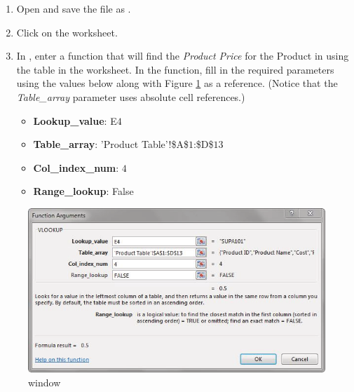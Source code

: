 \begin{enumerate}
	\item Open  and save the file as .
	\item Click on the  worksheet.
	\item In , enter a  function that will find the \textit{Product Price} for the Product in  using the table in the  worksheet. In the  function, fill in the required parameters using the values below along with Figure \ref{05:fig32} as a reference. (Notice that the \textit{Table\_array} parameter uses absolute cell references.)
	
	\begin{itemize}
		\item \textbf{Lookup\_value}: E$ 4 $
		\item \textbf{Table\_array}: 'Product Table'!\$A\$$ 1 $:\$D\$$ 13 $
		\item \textbf{Col\_index\_num}: $ 4 $
		\item \textbf{Range\_lookup}: False
	\end{itemize}
	
\end{enumerate}

\begin{figure}[H]
	\centering
	\includegraphics[width=\maxwidth{.95\linewidth}]{gfx/ch05_fig32}
	\caption{ window}
	\label{05:fig32}
\end{figure}

